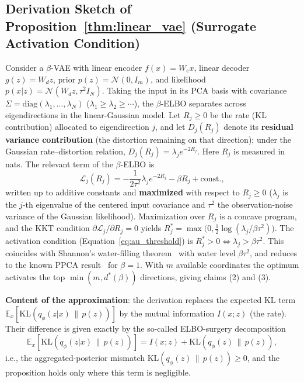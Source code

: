 \documentclass[make,article,submit,pdftex,moreauthors]{Definitions/mdpi}
\newcommand{\dstar}{d^{*}(\beta)}
\begin{document}
\subsection[\appendixname~\thesubsection]{Derivation Sketch of Proposition~\ref{thm:linear_vae} (Surrogate Activation Condition)}

Consider a $\beta$-VAE with linear encoder $f(x) = W_e x$, linear decoder
$g(z) = W_d z$, prior $p(z) = \mathcal{N}(0, I_m)$, and likelihood
$p(x|z) = \mathcal{N}(W_d z, \tau^2 I_N)$.
Taking the input in its PCA basis with covariance
$\Sigma = \mathrm{diag}(\lambda_1, \ldots, \lambda_N)$
($\lambda_1 \geq \lambda_2 \geq \cdots$), the $\beta$-ELBO separates across
eigendirections in the linear-Gaussian model.
Let $R_j \geq 0$ be the rate (KL contribution) allocated to eigendirection
$j$, and let $D_j(R_j)$ denote its \textbf{residual variance contribution}
(the distortion remaining on that direction); under the Gaussian
rate--distortion relation, $D_j(R_j) = \lambda_j e^{-2R_j}$.
Here $R_j$ is measured in nats.
The relevant term of the $\beta$-ELBO is
\begin{equation}
  \mathcal{L}_j(R_j) = -\frac{1}{2\tau^2}\lambda_j e^{-2R_j} - \beta R_j + \text{const.},
\end{equation}
written up to additive constants and \textbf{maximized} with respect to
$R_j \geq 0$ ($\lambda_j$ is the $j$-th eigenvalue of the centered input
covariance and $\tau^2$ the observation-noise variance of the Gaussian
likelihood).
Maximization over $R_j$ is a concave program, and the KKT condition
$\partial \mathcal{L}_j / \partial R_j = 0$ yields
$R_j^* = \max\bigl(0, \tfrac{1}{2}\log(\lambda_j / \beta\tau^2)\bigr)$.
The activation condition (Equation~\eqref{eq:au_threshold}) is
$R_j^* > 0 \iff \lambda_j > \beta\tau^2$.
This coincides with Shannon's water-filling theorem~\cite{cover2006elements}
with water level $\beta\tau^2$, and reduces to the known PPCA
result~\cite{tippingbishop1999ppca} for $\beta = 1$.
With $m$ available coordinates the optimum activates the top
$\min(m, \dstar)$ directions, giving claims (2) and (3).

\textbf{Content of the approximation}: the derivation replaces the expected
KL term $\mathbb{E}_x[\mathrm{KL}(q_\phi(z|x)\,\|\,p(z))]$ by the mutual
information $I(x; z)$ (the rate).
Their difference is given exactly by the so-called ELBO-surgery
decomposition~\cite{hoffman2016elbo}
\begin{equation}
  \mathbb{E}_x[\mathrm{KL}(q_\phi(z|x)\,\|\,p(z))]
  = I(x; z) + \mathrm{KL}(q_\phi(z)\,\|\,p(z)),
  \label{eq:elbo_surgery}
\end{equation}
i.e., the aggregated-posterior mismatch
$\mathrm{KL}(q_\phi(z)\,\|\,p(z)) \geq 0$, and the proposition holds only
where this term is negligible.
\end{document}
